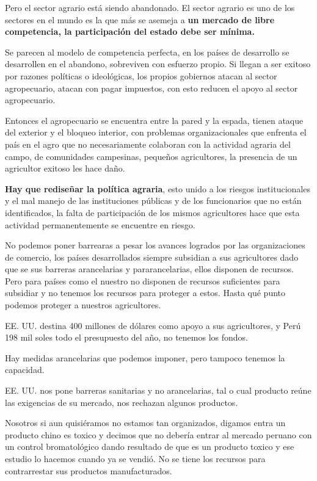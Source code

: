 \documentclass[
  letterpaper,
  DIV=11,
  numbers=noendperiod]{scrartcl}
\begin{document}
Pero el sector agrario está siendo abandonado. El sector agrario es uno
de los sectores en el mundo es la que más se asemeja a \textbf{un
mercado de libre competencia, la participación del estado debe ser
mínima.}

Se parecen al modelo de competencia perfecta, en los países de
desarrollo se desarrollen en el abandono, sobreviven con esfuerzo
propio. Si llegan a ser exitoso por razones políticas o ideológicas, los
propios gobiernos atacan al sector agropecuario, atacan con pagar
impuestos, con esto reducen el apoyo al sector agropecuario.

Entonces el agropecuario se encuentra entre la pared y la espada, tienen
ataque del exterior y el bloqueo interior, con problemas
organizacionales que enfrenta el país en el agro que no necesariamente
colaboran con la actividad agraria del campo, de comunidades campesinas,
pequeños agricultores, la presencia de un agricultor exitoso les hace
daño.

\textbf{Hay que rediseñar la política agraria}, esto unido a los riesgos
institucionales y el mal manejo de las instituciones públicas y de los
funcionarios que no están identificados, la falta de participación de
los mismos agricultores hace que esta actividad permanentemente se
encuentre en riesgo.

No podemos poner barrearas a pesar los avances logrados por las
organizaciones de comercio, los países desarrollados siempre subsidian a
sus agricultores dado que se sus barreras arancelarias y
pararancelarias, ellos disponen de recursos. Pero para países como el
nuestro no disponen de recursos suficientes para subsidiar y no tenemos
los recursos para proteger a estos. Hasta qué punto podemos proteger a
nuestros agricultores.

EE. UU. destina 400 millones de dólares como apoyo a sus agricultores, y
Perú 198 mil soles todo el presupuesto del año, no tenemos los fondos.

Hay medidas arancelarias que podemos imponer, pero tampoco tenemos la
capacidad.

EE. UU. nos pone barreras sanitarias y no arancelarias, tal o cual
producto reúne las exigencias de su mercado, nos rechazan algunos
productos.

Nosotros si aun quisiéramos no estamos tan organizados, digamos entra un
producto chino es toxico y decimos que no debería entrar al mercado
peruano con un control bromatológico dando resultado de que es un
producto toxico y ese estudio lo hacemos cuando ya se vendió. No se
tiene los recursos para contrarrestar sus productos manufacturados.
\end{document}
